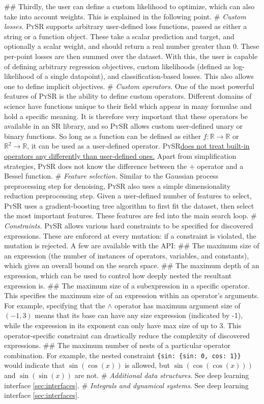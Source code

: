 \documentclass[letterpaper,twocolumn]{scrartcl}
\newcommand\pysr{\textsc{PySR}\xspace}
\newcommand\sr{SR\xspace}
\begin{document}
\begin{easylist}[itemize]
## Thirdly, the user can define a custom likelihood to optimize, which can also take into account weights. This is explained in the following point.
# \textit{Custom losses.}
\pysr supports arbitrary user-defined loss functions, passed as either a string or a function object.
These take a scalar prediction and target, and optionally a scalar weight, and should return a real number greater than 0.
These per-point losses are then summed over the dataset.
With this, the user is capable of defining arbitrary regression objectives, custom likelihoods (defined as log-likelihood of a single datapoint), and classification-based losses.
This also allows one to define implicit objectives.
# \textit{Custom operators.}
One of the most powerful features of \pysr is the ability to define custom operators.
Different domains of science have functions unique to their field which appear in many formulae and hold a specific meaning.
It is therefore very important that these operators be available in an \sr library, and so \pysr allows custom user-defined unary or binary functions.
So long as a function can be defined as either
$f:\mathbb{R}\rightarrow \mathbb{R}$ or $\mathbb{R}^2\rightarrow\mathbb{R}$, it can be used as a user-defined operator.
\pysr \ul{does not treat built-in operators any differently than user-defined ones.}
Apart from simplification strategies, \pysr does not know the difference between the $+$ operator and a Bessel function.
# \textit{Feature selection.}
Similar to the Gaussian process preprocessing step for denoising, \pysr also uses a simple dimensionality reduction preprocessing step.
Given a user-defined number of features to select, \pysr uses a gradient-boosting tree algorithm to first fit the dataset, then select the most important features.
These features are fed into the main search loop.
# \textit{Constraints.}
\pysr allows various hard constraints to be specified for discovered expressions.
These are enforced at every mutation: if a constraint is violated, the mutation is rejected. A few are available with the API:
## The maximum size of an expression (the number of instances of operators, variables, and constants), which gives an overall bound on the search space.
## The maximum depth of an expression, which can be used to control how deeply nested the resultant expression is.
## The maximum size of a subexpression in a specific operator.
This specifies the maximum size of an expression within an operator's arguments.
For example, specifying that the $\wedge$ operator has maximum argument size of $(-1, 3)$ means that its base can have any size expression (indicated by -1), while the expression in its exponent can only have max size of up to 3.
This operator-specific constraint can drastically reduce the complexity of discovered expressions.
## The maximum number of nests of a particular operator combination. For example, the nested constraint \texttt{\{sin: \{sin: 0, cos: 1\}\}} would indicate that $\sin(\cos(x))$ is allowed, but $\sin(\cos(\cos(x)))$ and $\sin(\sin(x))$ are not.
# \textit{Additional data structures}. See deep learning interface \cref{sec:interfaces}.
# \textit{Integrals and dynamical systems}. See deep learning interface \cref{sec:interfaces}.
\end{easylist}
\end{document}
